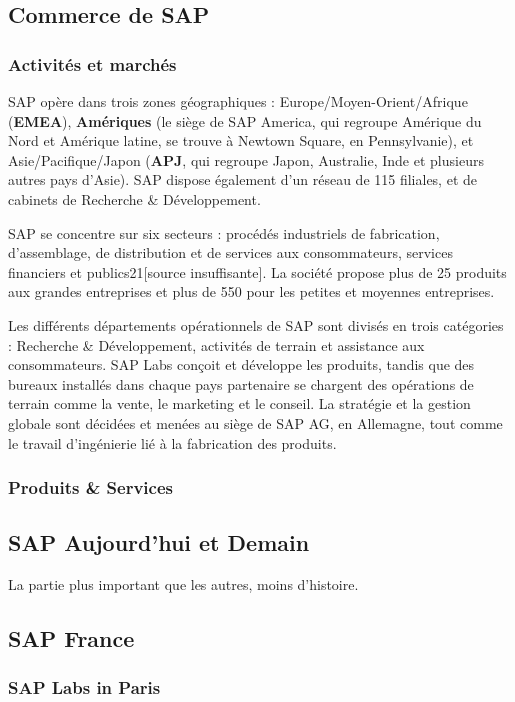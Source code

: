 \documentclass[12pt]{article}
\begin{document}
\subsection{Commerce de SAP} 
\subsubsection{Activités et marchés}
\cite{SAP-entreprise_wikipedia}SAP opère dans trois zones géographiques : Europe/Moyen-Orient/Afrique (\textbf{EMEA}), \textbf{Amériques} (le siège de SAP America, qui regroupe Amérique du Nord et Amérique latine, se trouve à Newtown Square, en Pennsylvanie), et Asie/Pacifique/Japon (\textbf{APJ}, qui regroupe Japon, Australie, Inde et plusieurs autres pays d’Asie). SAP dispose également d’un réseau de 115 filiales, et de cabinets de Recherche \& Développement.

SAP se concentre sur six secteurs : procédés industriels de fabrication, d’assemblage, de distribution et de services aux consommateurs, services financiers et publics21[source insuffisante]. La société propose plus de 25 produits aux grandes entreprises et plus de 550 pour les petites et moyennes entreprises.

Les différents départements opérationnels de SAP sont divisés en trois catégories : Recherche \& Développement, activités de terrain et assistance aux consommateurs. SAP Labs conçoit et développe les produits, tandis que des bureaux installés dans chaque pays partenaire se chargent des opérations de terrain comme la vente, le marketing et le conseil. La stratégie et la gestion globale sont décidées et menées au siège de SAP AG, en Allemagne, tout comme le travail d’ingénierie lié à la fabrication des produits.

\subsubsection{Produits \& Services}
\subsection{SAP Aujourd'hui et Demain}
La partie plus important que les autres, moins d'histoire.

\subsection{SAP France}
    \subsubsection{SAP Labs in Paris}
\end{document}
